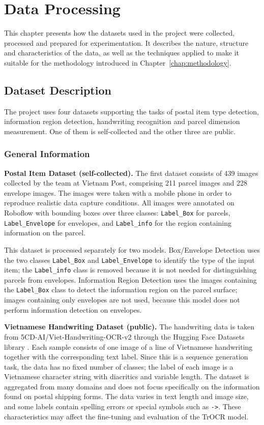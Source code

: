 \chapter{Data Processing}
\label{chap:data_processing}

This chapter presents how the datasets used in the project were collected, processed and prepared for experimentation. It describes the nature, structure and characteristics of the data, as well as the techniques applied to make it suitable for the methodology introduced in Chapter~\ref{chap:methodology}.

\section{Dataset Description}

The project uses four datasets supporting the tasks of postal item type detection, information region detection, handwriting recognition and parcel dimension measurement. One of them is self-collected and the other three are public.

\subsection{General Information}

\textbf{Postal Item Dataset (self-collected).} The first dataset consists of 439 images collected by the team at Vietnam Post, comprising 211 parcel images and 228 envelope images. The images were taken with a mobile phone in order to reproduce realistic data capture conditions. All images were annotated on Roboflow with bounding boxes over three classes: \texttt{Label\_Box} for parcels, \texttt{Label\_Envelope} for envelopes, and \texttt{Label\_info} for the region containing information on the parcel.

This dataset is processed separately for two models. Box/Envelope Detection uses the two classes \texttt{Label\_Box} and \texttt{Label\_Envelope} to identify the type of the input item; the \texttt{Label\_info} class is removed because it is not needed for distinguishing parcels from envelopes. Information Region Detection uses the images containing the \texttt{Label\_Box} class to detect the information region on the parcel surface; images containing only envelopes are not used, because this model does not perform information detection on envelopes.

\textbf{Vietnamese Handwriting Dataset (public).} The handwriting data is taken from 5CD-AI/Viet-\allowbreak Handwriting-\allowbreak OCR-v2 through the Hugging Face Datasets library \cite{viethandwriting}. Each sample consists of one image of a line of Vietnamese handwriting together with the corresponding text label. Since this is a sequence generation task, the data has no fixed number of classes; the label of each image is a Vietnamese character string with diacritics and variable length. The dataset is aggregated from many domains and does not focus specifically on the information found on postal shipping forms. The data varies in text length and image size, and some labels contain spelling errors or special symbols such as \texttt{->}. These characteristics may affect the fine-tuning and evaluation of the TrOCR model.

